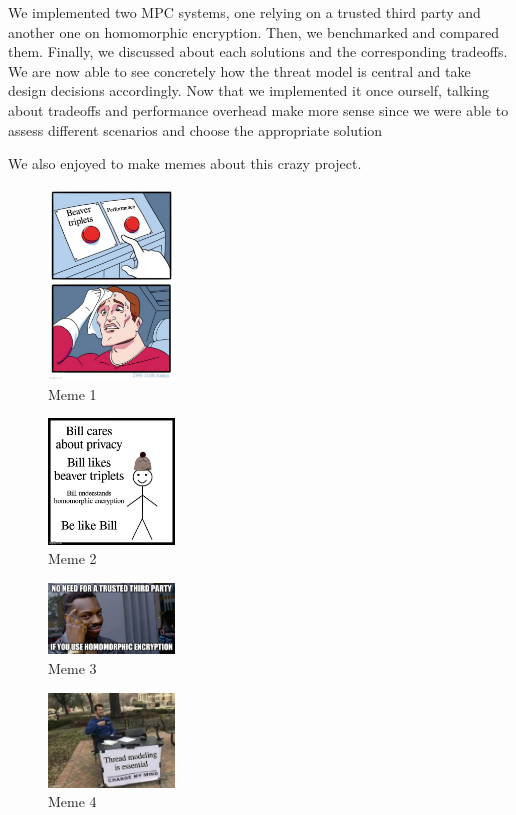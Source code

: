 \documentclass[10pt,conference]{IEEEtran}
\begin{document}
\begin{itemize}
We implemented two MPC systems, one relying on a trusted third party and another one on homomorphic encryption. Then, we benchmarked and compared them. Finally, we discussed about each solutions and the corresponding tradeoffs. We are now able to see concretely how the threat model is central and take design decisions accordingly. Now that we implemented it once ourself, talking about tradeoffs and performance overhead make more sense since we were able to assess different scenarios and choose the appropriate solution 

\newpage
We also enjoyed to make memes about this crazy project.
\begin{figure}[h]
  \caption{Meme 1}
  \includegraphics[width=0.3\textwidth]{pets_meme_1.jpg}
\end{figure}
\begin{figure}[h]
  \caption{Meme 2}
  \includegraphics[width=0.3\textwidth]{pets_meme_2.jpg}
\end{figure}
\begin{figure}[h]
  \caption{Meme 3}
  \includegraphics[width=0.3\textwidth]{pets_meme_3.jpg}
\end{figure}
\begin{figure}[h]
  \caption{Meme 4}
  \includegraphics[width=0.3\textwidth]{pets_meme_4.jpg}

\end{figure}
\end{itemize}
\end{document}
